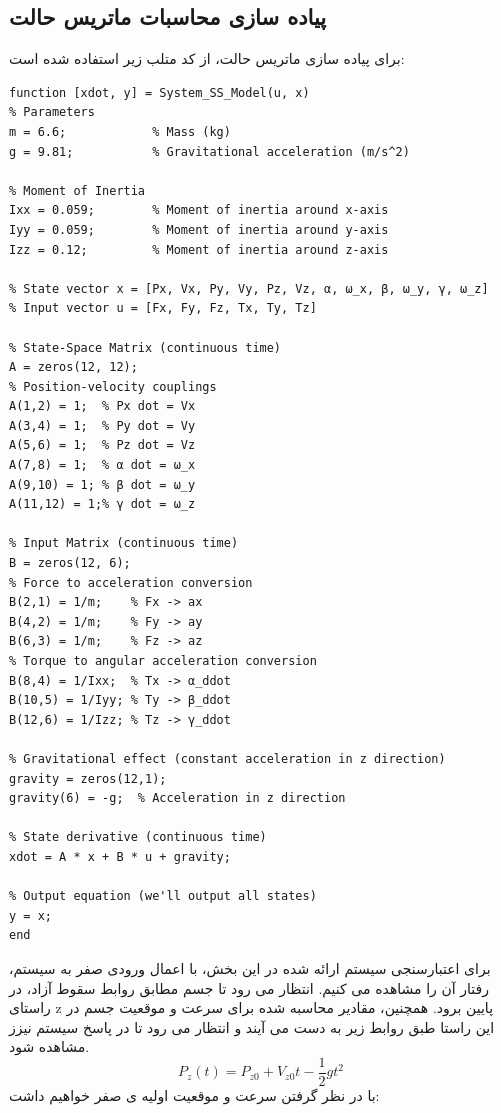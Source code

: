 \subsection{پیاده سازی محاسبات ماتریس حالت}
برای پیاده سازی ماتریس حالت، از کد متلب زیر استفاده شده است:
 \begin{latin}
 	\begin{verbatim}
function [xdot, y] = System_SS_Model(u, x)
% Parameters
m = 6.6;            % Mass (kg)
g = 9.81;           % Gravitational acceleration (m/s^2)

% Moment of Inertia
Ixx = 0.059;        % Moment of inertia around x-axis
Iyy = 0.059;        % Moment of inertia around y-axis
Izz = 0.12;         % Moment of inertia around z-axis

% State vector x = [Px, Vx, Py, Vy, Pz, Vz, α, ω_x, β, ω_y, γ, ω_z]
% Input vector u = [Fx, Fy, Fz, Tx, Ty, Tz]

% State-Space Matrix (continuous time)
A = zeros(12, 12);
% Position-velocity couplings
A(1,2) = 1;  % Px dot = Vx
A(3,4) = 1;  % Py dot = Vy
A(5,6) = 1;  % Pz dot = Vz
A(7,8) = 1;  % α dot = ω_x
A(9,10) = 1; % β dot = ω_y
A(11,12) = 1;% γ dot = ω_z

% Input Matrix (continuous time)
B = zeros(12, 6);
% Force to acceleration conversion
B(2,1) = 1/m;    % Fx -> ax
B(4,2) = 1/m;    % Fy -> ay
B(6,3) = 1/m;    % Fz -> az
% Torque to angular acceleration conversion
B(8,4) = 1/Ixx;  % Tx -> α_ddot
B(10,5) = 1/Iyy; % Ty -> β_ddot
B(12,6) = 1/Izz; % Tz -> γ_ddot

% Gravitational effect (constant acceleration in z direction)
gravity = zeros(12,1);
gravity(6) = -g;  % Acceleration in z direction

% State derivative (continuous time)
xdot = A * x + B * u + gravity;

% Output equation (we'll output all states)
y = x;
end
 	\end{verbatim}
 \end{latin}
 برای اعتبارسنجی سیستم ارائه شده در این بخش، با اعمال ورودی صفر به سیستم، رفتار آن را مشاهده می کنیم. انتظار می رود تا جسم مطابق روابط سقوط آزاد، در راستای z پایین برود. همچنین، مقادیر محاسبه شده برای سرعت و موقعیت جسم در این راستا طبق روابط زیر به دست می آیند و انتظار  می رود تا در پاسخ سیستم نیزز مشاهده شود.
 \begin{equation}
 	P_z(t) = P_{z0} + V_{z0} t - \frac{1}{2} g t^2
 \end{equation}
 با در نظر گرفتن سرعت و موقعیت اولیه ی صفر خواهیم داشت:
